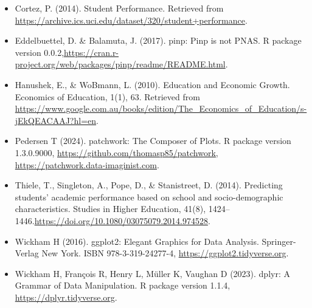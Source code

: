\documentclass[letterpaper,9pt,twocolumn,twoside,]{pinp}
\begin{document}
\begin{itemize}
\item
  Cortez, P. (2014). Student Performance. Retrieved from
  \url{https://archive.ics.uci.edu/dataset/320/student+performance}.
\item
  Eddelbuettel, D. \& Balamuta, J. (2017). pinp: Pinp is not PNAS. R
  package version
  0.0.2,\url{https://cran.r-project.org/web/packages/pinp/readme/README.html}.
\item
  Hanushek, E., \& WoBmann, L. (2010). Education and Economic Growth.
  Economics of Education, 1(1), 63. Retrieved from
  \url{https://www.google.com.au/books/edition/The_Economics_of_Education/s-jEkQEACAAJ?hl=en}.
\item
  Pedersen T (2024). patchwork: The Composer of Plots. R package version
  1.3.0.9000,
  \href{https://github.com/thomasp85/patchwork,\%20https://patchwork.data-imaginist.com}{https://github.com/thomasp85/patchwork,
  https://patchwork.data-imaginist.com}.
\item
  Thiele, T., Singleton, A., Pope, D., \& Stanistreet, D. (2014).
  Predicting students' academic performance based on school and
  socio-demographic characteristics. Studies in Higher Education, 41(8),
  1424--1446.\url{https://doi.org/10.1080/03075079.2014.974528}.
\item
  Wickham H (2016). ggplot2: Elegant Graphics for Data Analysis.
  Springer-Verlag New York. ISBN 978-3-319-24277-4,
  \url{https://ggplot2.tidyverse.org}.
\item
  Wickham H, François R, Henry L, Müller K, Vaughan D (2023). dplyr: A
  Grammar of Data Manipulation. R package version 1.1.4,
  \url{https://dplyr.tidyverse.org}.
\end{itemize}


\pnasbreak 



\end{document}
